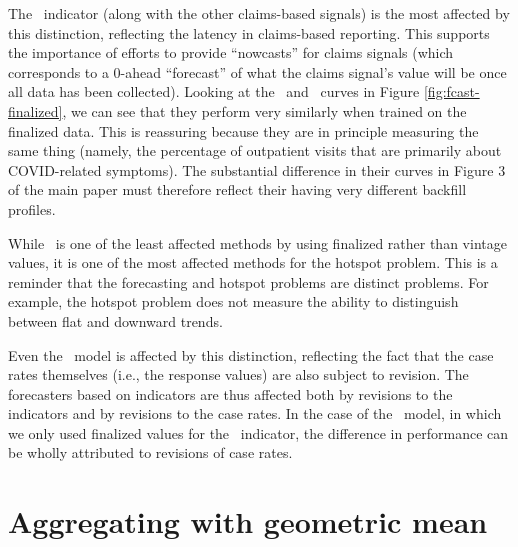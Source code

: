 \documentclass[9pt,twoside,lineno]{pnas-new}
\begin{document}
The \chngcli~indicator (along with the other claims-based signals) is the most
affected by this distinction, reflecting the latency in claims-based
reporting.  This supports the importance of efforts to provide ``nowcasts'' for claims signals
(which corresponds to a 0-ahead ``forecast'' of what the claims
signal's value will be once all data has been collected). Looking at
the \chngcli~and \dv~curves in Figure \ref{fig:fcast-finalized}, we
can see that they perform very similarly when trained on the finalized data.  This is reassuring
because they are in principle measuring the same thing (namely, the percentage of
  outpatient visits that are primarily about COVID-related symptoms).
  The substantial difference in their curves in Figure 3 of the
  main paper must therefore reflect their having very different
  backfill profiles.  
  
While \dv~is one of the least affected methods by using finalized
rather than vintage values, it is one of the most affected methods for the hotspot problem.
This is a reminder that the forecasting and hotspot problems are
distinct problems.  For example, the hotspot problem does not measure
the ability to distinguish between flat and downward trends.

Even the \ar~model is affected by this distinction, reflecting the
fact that the case rates themselves (i.e., the response values) are also
subject to revision.  The forecasters based on indicators are thus
affected both by revisions to the indicators and by revisions to the
case rates.  In the case of the \gs~model, in which we only used finalized
values for the \gs~indicator, the difference in performance can be
wholly attributed to revisions of case rates.


\hypertarget{aggregating-with-geometric-mean}{%
\section{Aggregating with geometric
mean}\label{aggregating-with-geometric-mean}}
\end{document}
